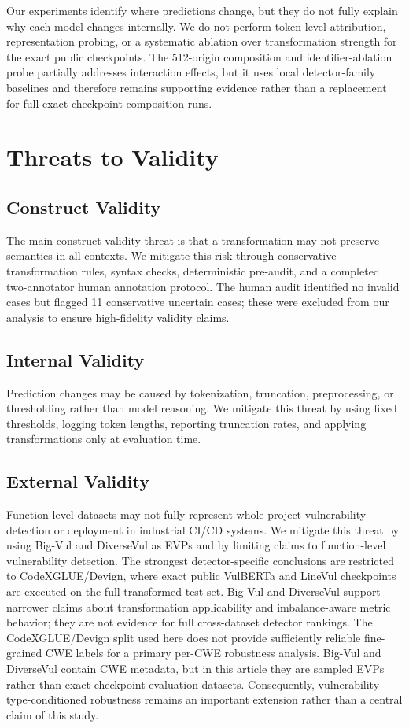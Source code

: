 \documentclass[a4paper,fleqn]{cas-dc}
\begin{document}
Our experiments identify where predictions change, but they do not fully
explain why each model changes internally. We do not perform token-level
attribution, representation probing, or a systematic ablation over
transformation strength for the exact public checkpoints. The 512-origin
composition and identifier-ablation probe partially addresses interaction
effects, but it uses local detector-family baselines and therefore remains
supporting evidence rather than a replacement for full exact-checkpoint
composition runs.

\section{Threats to Validity}

\subsection{Construct Validity}

The main construct validity threat is that a transformation may not preserve
semantics in all contexts. We mitigate this risk through conservative
transformation rules, syntax checks, deterministic pre-audit, and a completed
two-annotator human annotation protocol. The human audit identified no invalid
cases but flagged 11 conservative uncertain cases; these were excluded from our
analysis to ensure high-fidelity validity claims.

\subsection{Internal Validity}

Prediction changes may be caused by tokenization, truncation, preprocessing,
or thresholding rather than model reasoning. We mitigate this threat by using
fixed thresholds, logging token lengths, reporting truncation rates, and
applying transformations only at evaluation time.

\subsection{External Validity}

Function-level datasets may not fully represent whole-project vulnerability
detection or deployment in industrial CI/CD systems. We mitigate this threat
by using Big-Vul and DiverseVul as EVPs and by limiting
claims to function-level vulnerability detection. The strongest
detector-specific conclusions are restricted to CodeXGLUE/Devign, where exact
public VulBERTa and LineVul checkpoints are executed on the full transformed
test set. Big-Vul and DiverseVul support narrower claims about transformation
applicability and imbalance-aware metric behavior; they are not evidence for
full cross-dataset detector rankings.
The CodeXGLUE/Devign split used here does not provide sufficiently reliable
fine-grained CWE labels for a primary per-CWE robustness analysis. Big-Vul and
DiverseVul contain CWE metadata, but in this article they are sampled EVPs rather
than exact-checkpoint evaluation datasets.
Consequently, vulnerability-type-conditioned robustness remains an important
extension rather than a central claim of this study.
\end{document}
